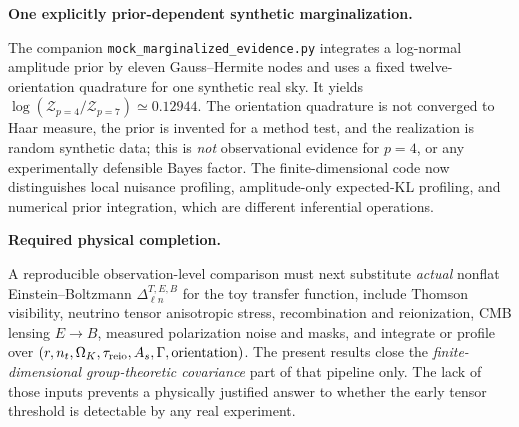 \documentclass[aps,prd,onecolumn,notitlepage,groupedaddress,11pt]{revtex4-2}
\begin{document}
\par\medskip\noindent\textbf{One explicitly prior-dependent synthetic marginalization.}\par\noindent The companion \texttt{mock\_marginalized\_evidence.py} integrates a log-normal amplitude prior by eleven Gauss--Hermite nodes and uses a fixed twelve-orientation quadrature for one synthetic real sky. It yields $\log(\mathcal Z_{p=4}/\mathcal Z_{p=7})\simeq0.12944$. The orientation quadrature is not converged to Haar measure, the prior is invented for a method test, and the realization is random synthetic data; this is \emph{not} observational evidence for $p=4$, or any experimentally defensible Bayes factor. The finite-dimensional code now distinguishes local nuisance profiling, amplitude-only expected-KL profiling, and numerical prior integration, which are different inferential operations.

\par\medskip\noindent\textbf{Required physical completion.}\par\noindent A reproducible observation-level comparison must next substitute \emph{actual} nonflat Einstein--Boltzmann $\Delta^{T,E,B}_{\ell n}$ for the toy transfer function, include Thomson visibility, neutrino tensor anisotropic stress, recombination and reionization, CMB lensing $E\to B$, measured polarization noise and masks, and integrate or profile over $(r,n_t,\Omega_K,\tau_{\rm reio},A_s,\Gamma,\mathrm{orientation})$. The present results close the \emph{finite-dimensional group-theoretic covariance} part of that pipeline only. The lack of those inputs prevents a physically justified answer to whether the early tensor threshold is detectable by any real experiment.
\end{document}
